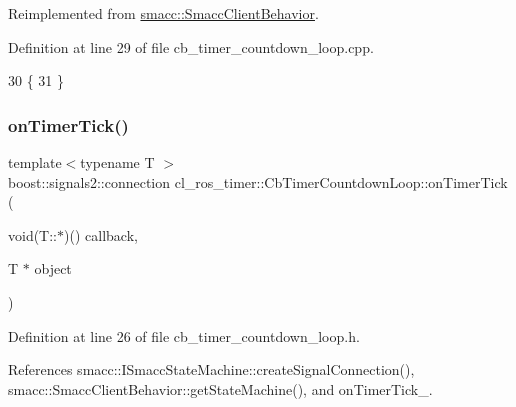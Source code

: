 Reimplemented from \hyperlink{classsmacc_1_1SmaccClientBehavior_ac0cd72d42bd00425362a97c9803ecce5}{smacc\+::\+Smacc\+Client\+Behavior}.



Definition at line 29 of file cb\+\_\+timer\+\_\+countdown\+\_\+loop.\+cpp.


\begin{DoxyCode}
30 \{
31 \}
\end{DoxyCode}
\mbox{\label{classcl__ros__timer_1_1CbTimerCountdownLoop_ad251cc8444ca7070f64658bbb77e1275}} 
\subsubsection{\texorpdfstring{on\+Timer\+Tick()}{onTimerTick()}}
{\footnotesize\ttfamily template$<$typename T $>$ \\
boost\+::signals2\+::connection cl\+\_\+ros\+\_\+timer\+::\+Cb\+Timer\+Countdown\+Loop\+::on\+Timer\+Tick (\begin{DoxyParamCaption}\item[{void(T\+::$\ast$)()}]{callback,  }\item[{T $\ast$}]{object }\end{DoxyParamCaption})\hspace{0.3cm}{\ttfamily [inline]}}



Definition at line 26 of file cb\+\_\+timer\+\_\+countdown\+\_\+loop.\+h.



References smacc\+::\+I\+Smacc\+State\+Machine\+::create\+Signal\+Connection(), smacc\+::\+Smacc\+Client\+Behavior\+::get\+State\+Machine(), and on\+Timer\+Tick\+\_\+.


